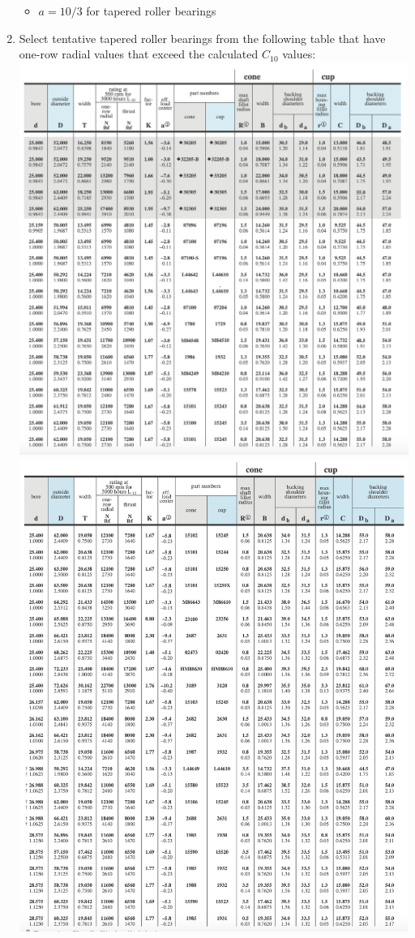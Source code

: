 \documentclass[11pt, fleqn]{article}
\begin{document}
\begin{enumerate}
    \begin{itemize}
        \item $a = 10/3$ for tapered roller bearings
    \end{itemize}
    \item Select tentative tapered roller bearings from the following table that have one-row radial values that exceed the calculated $C_{10}$ values:\\
    \includegraphics[scale=0.65]{Bearings/tapered-bearings-pt1.png}\\
    \includegraphics[scale=0.8]{Bearings/tapered-bearings-pt2.png}

\end{enumerate}
\end{document}
